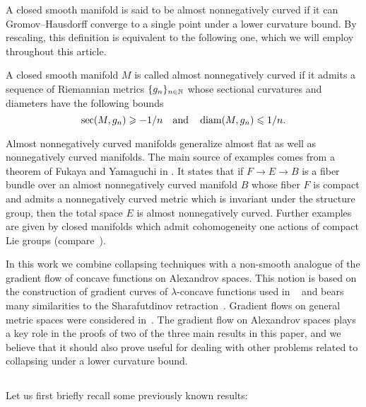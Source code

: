 \documentclass{amsart}
\begin{document}
A closed smooth manifold is  said
to be almost nonnegatively curved
if
it can Gromov--Hausdorff converge to a single point
under a lower curvature bound.
By rescaling, this definition is equivalent to the following one,
which we will employ throughout this article.

\begin{defn}
A closed smooth manifold $M$ is called almost nonnegatively curved
if it admits a sequence of Riemannian metrics $\{g_n\}_{n\in{\Bbb N}}$
whose sectional curvatures and diameters have the following bounds
$$\sec(M,g_n)\geqslant -1/n\ \ \ \text{and} \ \ \ \operatorname{\rm diam}(M,g_n)\leqslant 1/n.$$
\end{defn}

Almost nonnegatively curved manifolds
generalize almost flat as well as nonnegatively
curved manifolds.
The main source of examples
comes from a theorem of Fukaya and Yamaguchi in \cite{FY}.
It states that
if $F\to E\to B$ is a fiber bundle
over an almost nonnegatively curved manifold $B$
whose fiber $F$ is compact
and admits a nonnegatively curved metric 
which is invariant under the
structure group, 
then the total space $E$ is almost nonnegatively curved.
Further examples are given by closed manifolds which admit
cohomogeneity one actions of
compact Lie groups %
(compare~\cite{ST}).


In this work we combine collapsing techniques with a non-smooth analogue of the gradient flow of concave functions on Alexandrov spaces.
This notion is based  on the construction  of gradient curves of $\lambda$-concave functions used in ~\cite{PP} and bears many similarities to the Sharafutdinov retraction~\cite{Shar}.
Gradient flows on general metric spaces were considered in~\cite{grad-flow-book}.
The gradient flow on Alexandrov spaces plays a key role in the proofs of two of the three main results in this paper, and we believe that it should also prove useful for dealing with other problems related to collapsing under a lower curvature bound.

\subsection{} Let us first briefly recall some  previously known results:
\end{document}

